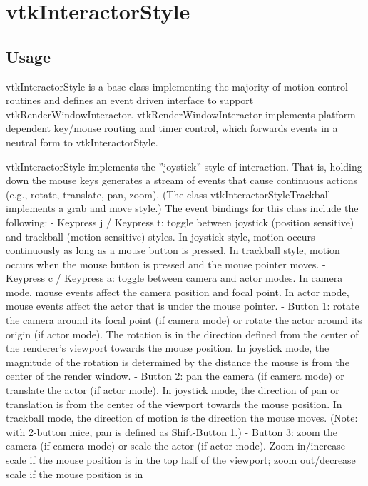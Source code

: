 \section{vtkInteractorStyle}

\subsection{Usage}

 vtkInteractorStyle is a base class implementing the majority of motion
 control routines and defines an event driven interface to support
 vtkRenderWindowInteractor. vtkRenderWindowInteractor implements 
 platform dependent key/mouse routing and timer control, which forwards
 events in a neutral form to vtkInteractorStyle.

 vtkInteractorStyle implements the ''joystick'' style of interaction. That
 is, holding down the mouse keys generates a stream of events that cause
 continuous actions (e.g., rotate, translate, pan, zoom). (The class
 vtkInteractorStyleTrackball implements a grab and move style.) The event
 bindings for this class include the following:
 - Keypress j / Keypress t: toggle between joystick (position sensitive) and
 trackball (motion sensitive) styles. In joystick style, motion occurs
 continuously as long as a mouse button is pressed. In trackball style,
 motion occurs when the mouse button is pressed and the mouse pointer
 moves.
 - Keypress c / Keypress a: toggle between camera and actor modes. In
 camera mode, mouse events affect the camera position and focal point. In
 actor mode, mouse events affect the actor that is under the mouse pointer.
 - Button 1: rotate the camera around its focal point (if camera mode) or
 rotate the actor around its origin (if actor mode). The rotation is in the
 direction defined from the center of the renderer's viewport towards
 the mouse position. In joystick mode, the magnitude of the rotation is
 determined by the distance the mouse is from the center of the render
 window.
 - Button 2: pan the camera (if camera mode) or translate the actor (if
 actor mode). In joystick mode, the direction of pan or translation is
 from the center of the viewport towards the mouse position. In trackball
 mode, the direction of motion is the direction the mouse moves. (Note:
 with 2-button mice, pan is defined as Shift-Button 1.)
 - Button 3: zoom the camera (if camera mode) or scale the actor (if
 actor mode). Zoom in/increase scale if the mouse position is in the top
 half of the viewport; zoom out/decrease scale if the mouse position is in
